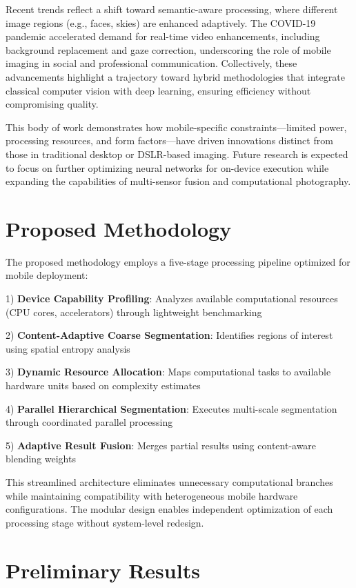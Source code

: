 \documentclass[conference]{IEEEtran}
\begin{document}
Recent trends reflect a shift toward semantic-aware processing, where different image regions (e.g., faces, skies) are enhanced adaptively. The COVID-19 pandemic accelerated demand for real-time video enhancements, including background replacement and gaze correction, underscoring the role of mobile imaging in social and professional communication. Collectively, these advancements highlight a trajectory toward hybrid methodologies that integrate classical computer vision with deep learning, ensuring efficiency without compromising quality.  

This body of work demonstrates how mobile-specific constraints—limited power, processing resources, and form factors—have driven innovations distinct from those in traditional desktop or DSLR-based imaging. Future research is expected to focus on further optimizing neural networks for on-device execution while expanding the capabilities of multi-sensor fusion and computational photography.


\section{Proposed Methodology}
\label{sec:proposed_methodology}


The proposed methodology employs a five-stage processing pipeline optimized for mobile deployment:

1) \textbf{Device Capability Profiling}: Analyzes available computational resources (CPU cores, accelerators) through lightweight benchmarking

2) \textbf{Content-Adaptive Coarse Segmentation}: Identifies regions of interest using spatial entropy analysis

3) \textbf{Dynamic Resource Allocation}: Maps computational tasks to available hardware units based on complexity estimates

4) \textbf{Parallel Hierarchical Segmentation}: Executes multi-scale segmentation through coordinated parallel processing

5) \textbf{Adaptive Result Fusion}: Merges partial results using content-aware blending weights

This streamlined architecture eliminates unnecessary computational branches while maintaining compatibility with heterogeneous mobile hardware configurations. The modular design enables independent optimization of each processing stage without system-level redesign.

\section{Preliminary Results}
\label{sec:results}
\end{document}
